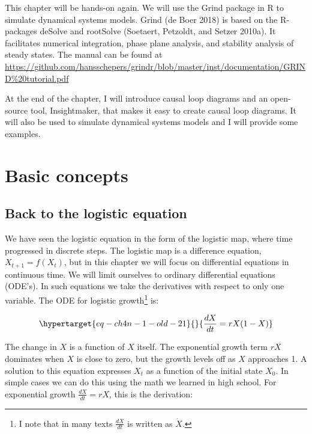 \documentclass[
  a4paper,
  DIV=11,
  numbers=noendperiod,
  oneside]{scrreprt}
\begin{document}
This chapter will be hands-on again. We will use the Grind package in R
to simulate dynamical systems models. Grind (de Boer 2018) is based on
the R-packages deSolve and rootSolve (Soetaert, Petzoldt, and Setzer
2010a). It facilitates numerical integration, phase plane analysis, and
stability analysis of steady states. The manual can be found at
\url{https://github.com/hansschepers/grindr/blob/master/inst/documentation/GRIND\%20tutorial.pdf}

At the end of the chapter, I will introduce causal loop diagrams and an
open-source tool, Insightmaker, that makes it easy to create causal loop
diagrams. It will also be used to simulate dynamical systems models and
I will provide some examples.

\hypertarget{sec-Basic-concepts}{%
\section{Basic concepts}\label{sec-Basic-concepts}}

\hypertarget{sec-Back-to-the-logistic-equation}{%
\subsection{Back to the logistic
equation}\label{sec-Back-to-the-logistic-equation}}

We have seen the logistic equation in the form of the logistic map,
where time progressed in discrete steps. The logistic map is a
difference equation, \(X_{t + 1} = f(X_{t})\), but in this chapter we
will focus on differential equations in continuous time. We will limit
ourselves to ordinary differential equations (ODE's). In such equations
we take the derivatives with respect to only one variable. The ODE for
logistic growth\footnote{I note that in many texts \(\frac{dX}{dt}\) is
  written as \(\dot{X}\).} is:

\begin{equation}\protect\hypertarget{eq-ch4n-1-old-21}{}{
\frac{dX}{dt} = rX(1 - X)
}\label{eq-ch4n-1-old-21}\end{equation}

The change in \(X\) is a function of \(X\) itself. The exponential
growth term \(rX\) dominates when \(X\) is close to zero, but the growth
levels off as \(X\) approaches 1. A solution to this equation expresses
\(X_{t}\) as a function of the initial state \(X_{0}\). In simple cases
we can do this using the math we learned in high school. For exponential
growth \(\frac{dX}{dt} = rX\), this is the derivation:
\end{document}
